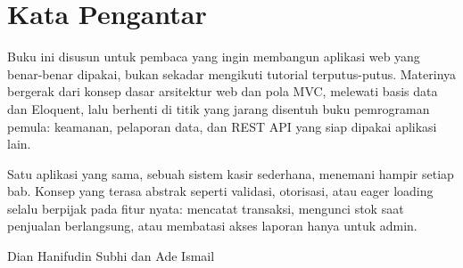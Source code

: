 
\chapter*{Kata Pengantar}

\noindent
Buku ini disusun untuk pembaca yang ingin membangun aplikasi web yang benar-benar
dipakai, bukan sekadar mengikuti tutorial terputus-putus. Materinya bergerak dari
konsep dasar arsitektur web dan pola MVC, melewati basis data dan Eloquent,
lalu berhenti di titik yang jarang disentuh buku pemrograman pemula: keamanan,
pelaporan data, dan REST API yang siap dipakai aplikasi lain.

\vspace{1cm}

\noindent
Satu aplikasi yang sama, sebuah sistem kasir sederhana, menemani hampir setiap
bab. Konsep yang terasa abstrak seperti validasi, otorisasi, atau eager loading
selalu berpijak pada fitur nyata: mencatat transaksi, mengunci stok saat
penjualan berlangsung, atau membatasi akses laporan hanya untuk admin.

\vspace{1cm}

\noindent
Dian Hanifudin Subhi dan Ade Ismail

\vspace{2cm}

\cleardoublepage

